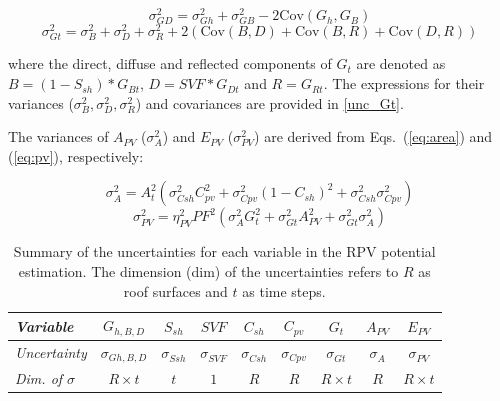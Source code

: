 \begin{equation}
\label{eq:unc_GD}
\sigma^2_{GD} = \sigma^2_{Gh} +  \sigma^2_{GB} - 2 \mathrm{Cov}(G_h, G_B) 
\end{equation}
%
\begin{equation}
\label{eq:irrad_unc}
\sigma^2_{Gt} = \sigma^2_{B} +  \sigma^2_{D} +  \sigma^2_{R} + 2 (\mathrm{Cov}(B, D) + \mathrm{Cov}(B, R) + \mathrm{Cov}(D, R))
\end{equation}

where the direct, diffuse and reflected components of $G_t$ are denoted as $B=(1 - S_{sh}) * G_{Bt}$, $D=SVF * G_{Dt}$ and $R=G_{Rt}$. The expressions for their variances ($\sigma^2_{B}, \sigma^2_{D}, \sigma^2_{R}$) and covariances are provided in \ref{unc_Gt}. 

The variances of $A_{PV}$ ($\sigma^2_A$) and $E_{PV}$ ($\sigma^2_{PV}$) are derived from Eqs.~(\ref{eq:area}) and (\ref{eq:pv}), respectively:

\begin{equation}
\label{eq:area_unc}
\sigma^2_{A}  = A_{t}^2 (\sigma^2_{Csh} C_{pv}^2 + \sigma^2_{Cpv} (1-C_{sh})^2 + \sigma^2_{Csh} \sigma^2_{Cpv}) 
\end{equation}
%
\begin{equation}
\label{eq:pv_unc}
\sigma^2_{PV}  = \eta_{PV}^2 PF^2 (\sigma^2_{A} G_{t}^2 + \sigma^2_{Gt} A_{PV}^2 + \sigma^2_{Gt} \sigma^2_{A}) 
\end{equation}

\begin{table}[tb]
\centering
\footnotesize
\caption{Summary of the uncertainties for each variable in the RPV potential estimation. The dimension (dim) of the uncertainties refers to $R$ as roof surfaces and $t$ as time steps.}
\label{tab:uncs}
\begin{tabular} {lcccccccc}
\hline 
\textit{Variable}  & $G_{h,B,D}$  & $S_{sh}$  & $SVF$ & $C_{sh}$ & $C_{pv}$ & $G_t$  & $A_{PV}$ & $E_{PV}$                  \\
\hline 
\textit{Uncertainty}    & $\sigma_{Gh,B,D}$    & $\sigma_{Ssh}$     & $\sigma_{SVF}$     & $\sigma_{Csh}$  & $\sigma_{Cpv}$    & $\sigma_{Gt}$   & $\sigma_{A}$     & $\sigma_{PV}$                     \\
\textit{Dim. of $\sigma$} & $R \times t$ & $t$ & $1$   & $R$     & $R$     & $R \times t$ & $R$    & $R \times t$ \\
\hline 
\end{tabular}
\end{table}

